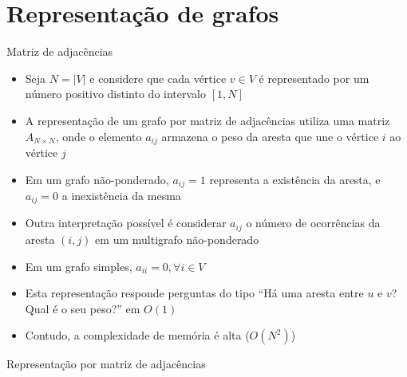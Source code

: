 \section{Representação de grafos}

\begin{frame}[fragile]{Matriz de adjacências}

    \begin{itemize}
        \item Seja $N = |V|$ e considere que cada vértice $v\in V$ é representado por um
            número positivo distinto do intervalo $[1, N]$

        \item A representação de um grafo por matriz de adjacências utiliza uma matriz
            $A_{N\times N}$, onde o elemento $a_{ij}$ armazena o peso da aresta que une o vértice
            $i$ ao vértice $j$

        \item Em um grafo não-ponderado, $a_{ij} = 1$ representa a existência da aresta, e 
            $a_{ij} = 0$ a inexistência da mesma

        \item Outra interpretação possível é considerar $a_{ij}$ o número de ocorrências da aresta
            $(i, j)$ em um multigrafo não-ponderado

        \item Em um grafo simples, $a_{ii} = 0, \forall i\in V$

        \item Esta representação responde perguntas do tipo ``Há uma aresta entre $u$ e $v$? Qual
            é o seu peso?'' em $O(1)$

        \item Contudo, a complexidade de memória é alta ($O(N^2)$)
    \end{itemize}

\end{frame}



\begin{frame}[fragile]{Representação por matriz de adjacências}
\end{frame}

